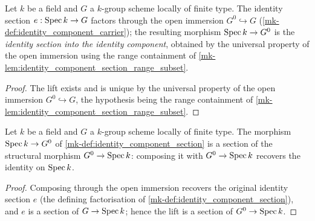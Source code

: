 \begin{definition}\label{mk-def:identity_component_section}
  \leanok

  Let \(k\) be a field and \(G\) a \(k\)-group scheme locally of finite
  type. The identity section \(e : \operatorname{Spec} k \to G\) factors through the
  open immersion \(G^0 \hookrightarrow G\)
  (\ref{mk-def:identity_component_carrier}); the resulting morphism
  \(\operatorname{Spec} k \to G^0\) is the \emph{identity section into the identity
  component}, obtained by the universal property of the open immersion
  using the range containment of
  \ref{mk-lem:identity_component_section_range_subset}.
\end{definition}
\begin{proof}
  The lift exists and is unique by the universal property of the open
  immersion \(G^0 \hookrightarrow G\), the hypothesis being the range
  containment of \ref{mk-lem:identity_component_section_range_subset}.

\end{proof}

\begin{lemma}\label{mk-lem:identity_component_section_is_section}
  \leanok

  Let \(k\) be a field and \(G\) a \(k\)-group scheme locally of finite
  type. The morphism \(\operatorname{Spec} k \to G^0\) of
  \ref{mk-def:identity_component_section} is a section of the structural
  morphism \(G^0 \to \operatorname{Spec} k\): composing it with \(G^0 \to \operatorname{Spec} k\)
  recovers the identity on \(\operatorname{Spec} k\).
\end{lemma}
\begin{proof}
  Composing through the open immersion recovers the original identity
  section \(e\) (the defining factorisation of
  \ref{mk-def:identity_component_section}), and \(e\) is a section of
  \(G \to \operatorname{Spec} k\); hence the lift is a section of \(G^0 \to \operatorname{Spec} k\).

\end{proof}

